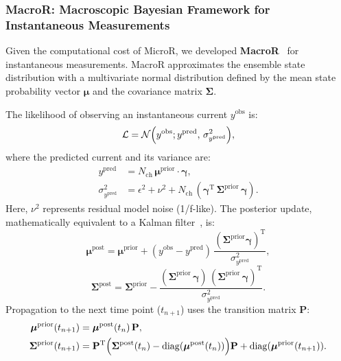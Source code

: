 \documentclass[9pt]{elife}
\begin{document}
\subsubsection{MacroR: Macroscopic Bayesian Framework for Instantaneous Measurements}
Given the computational cost of MicroR, we developed \textbf{MacroR}~\cite{Moffatt} for instantaneous measurements. MacroR approximates the ensemble state distribution with a multivariate normal distribution defined by the mean state probability vector \( \boldsymbol{\mu} \) and the covariance matrix \( \boldsymbol{\Sigma} \).

The likelihood of observing an instantaneous current \( y^{\text{obs}} \) is:
\begin{equation}
	\mathcal{L} = \mathcal{N}\Bigl( y^{\text{obs}} ; y^{\text{pred}},\, \sigma^2_{y^{\text{pred}}} \Bigr),
	\label{eq:macro_likelihood}
\end{equation}
where the predicted current and its variance are:
\begin{align}
	y^{\text{pred}} &= N_{\text{ch}}\, \boldsymbol{\mu}^{\text{prior}} \cdot \boldsymbol{\gamma}, \\
	\sigma^2_{y^{\text{pred}}} &= \epsilon^2 + \nu^2 + N_{\text{ch}}\, (\boldsymbol{\gamma}^{\mathrm{T}}\, \boldsymbol{\Sigma}^{\text{prior}}\, \boldsymbol{\gamma}).
\end{align}
Here, $\nu^2$ represents residual model noise (1/f-like). The posterior update, mathematically equivalent to a Kalman filter~\cite{stepanyuk2011efficient}, is:
\begin{equation}
	\boldsymbol{\mu}^{\text{post}} = \boldsymbol{\mu}^{\text{prior}} + (y^{\text{obs}} - y^{\text{pred}})\, \frac{(\boldsymbol{\Sigma}^{\text{prior}} \boldsymbol{\gamma})^{\mathrm{T}}}{\sigma^2_{y^{\text{pred}}}},
\end{equation}
\begin{equation}
	\boldsymbol{\Sigma}^{\text{post}} = \boldsymbol{\Sigma}^{\text{prior}} - \frac{(\boldsymbol{\Sigma}^{\text{prior}}\, \boldsymbol{\gamma})\, (\boldsymbol{\Sigma}^{\text{prior}}\, \boldsymbol{\gamma})^{\mathrm{T}}}{\sigma^2_{y^{\text{pred}}}}.
\end{equation}
Propagation to the next time point ($t_{n+1}$) uses the transition matrix $\mathbf{P}$:
\begin{align}
	\boldsymbol{\mu}^{\text{prior}}(t_{n+1}) &= \boldsymbol{\mu}^{\text{post}}(t_n)\, \mathbf{P}, \\
	\boldsymbol{\Sigma}^{\text{prior}}(t_{n+1}) &= \mathbf{P}^{\mathrm{T}} \Bigl( \boldsymbol{\Sigma}^{\text{post}}(t_n) - \mathrm{diag}(\boldsymbol{\mu}^{\text{post}}(t_n)) \Bigr) \mathbf{P} + \mathrm{diag}(\boldsymbol{\mu}^{\text{prior}}(t_{n+1})).
\end{align}
\end{document}

